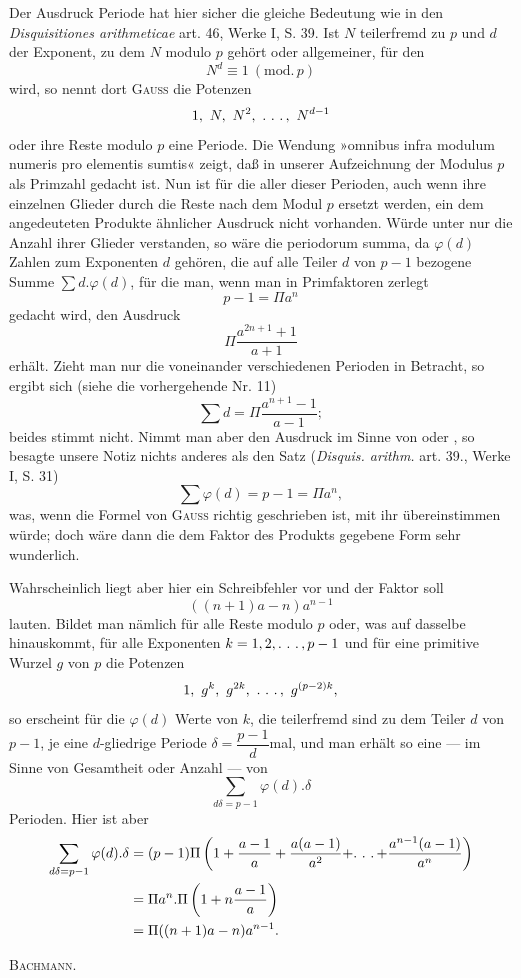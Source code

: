 \medskip\begingroup\small
\indent Der Ausdruck Periode hat hier sicher die gleiche Bedeutung wie in den \textit{Disquisitiones arithmeticae} art. 46, Werke I, S. 39. Ist \(N\) teilerfremd zu \(p\) und \(d\) der Exponent, zu dem \(N\) modulo \(p\) gehört oder allgemeiner, für den
\[
N^d\equiv1\ (\mathrm{mod.}\,p)
\]
\noindent wird, so nennt dort \textsc{Gauss} die Potenzen
\[
1,\ N,\ N^2,\ \ldotp\,\ldotp\,\ldotp,\ N^{d-1}
\]
\noindent oder ihre Reste modulo \(p\) eine Periode. Die Wendung »omnibus infra modulum numeris pro elementis sumtis« zeigt, daß in unserer Aufzeichnung der Modulus \(p\) als Primzahl gedacht ist. Nun ist für die  aller dieser Perioden, auch wenn ihre einzelnen Glieder durch die Reste nach dem Modul \(p\) ersetzt werden, ein dem angedeuteten Produkte ähnlicher Ausdruck nicht vorhanden. Würde unter  nur die Anzahl ihrer Glieder verstanden, so wäre die periodorum summa, da \(\varphi(d)\) Zahlen zum Exponenten \(d\) gehören, die auf alle Teiler \(d\) von \(p-1\) bezogene Summe \(\sum d.\varphi(d)\), für die man, wenn man in Primfaktoren zerlegt
\[
p-1=\Pi a^n
\]
\endgroup
\clearpage{}
\begingroup\small
\noindent gedacht wird, den Ausdruck
\[
\Pi\frac{a^{2n+1}+1}{a+1}
\]
\noindent erhält. Zieht man nur die voneinander verschiedenen Perioden in Betracht, so ergibt sich (siehe die vorhergehende Nr. 11)
\[
\sum d=\Pi\frac{a^{n+1}-1}{a-1};
\]
\noindent beides stimmt nicht. Nimmt man aber den Ausdruck  im Sinne von  oder , so besagte unsere Notiz nichts anderes als den Satz (\textit{Disquis. arithm.} art. 39., Werke I, S. 31)
\[
\sum\varphi(d)=p-1=\Pi a^n,
\]
\noindent was, wenn die Formel von \textsc{Gauss} richtig geschrieben ist, mit ihr übereinstimmen würde; doch wäre dann die dem Faktor des Produkts gegebene Form sehr wunderlich.

\indent Wahrscheinlich liegt aber hier ein Schreibfehler vor und der Faktor soll
\[
((n+1)a-n)a^{n-1}
\]
\noindent lauten. Bildet man nämlich für alle Reste modulo \(p\) oder, was auf dasselbe hinauskommt, für alle Exponenten \(k=1,2,\ldotp\,\ldotp\,\ldotp,p-1\) und für eine primitive Wurzel \(g\) von \(p\) die Potenzen
\[
1,\ g^k,\ g^{2k},\ \ldotp\,\ldotp\,\ldotp,\ g^{(p-2)k},
\]
\noindent so erscheint für die \(\varphi(d)\) Werte von \(k\), die teilerfremd sind zu dem Teiler \(d\) von \(p-1\), je eine \(d\)-gliedrige Periode \(\delta=\dfrac{p-1}{d}\)mal, und man erhält so eine  — im Sinne von Gesamtheit oder Anzahl — von
\[
\sum_{d\delta=p-1}\varphi(d).\delta
\]
\noindent Perioden. Hier ist aber
\[
\begin{aligned}
\sum_{d\delta=p-1}\varphi(d).\delta
&=(p-1)\Pi\left(1+\frac{a-1}{a}+\frac{a(a-1)}{a^2}+\ldotp\,\ldotp\,\ldotp+\frac{a^{n-1}(a-1)}{a^n}\right)\\
&=\Pi a^n.\Pi\left(1+n\frac{a-1}{a}\right)\\
&=\Pi((n+1)a-n)a^{n-1}.
\end{aligned}
\]
\par\noindent\hfill\textsc{Bachmann}.
\par\endgroup

